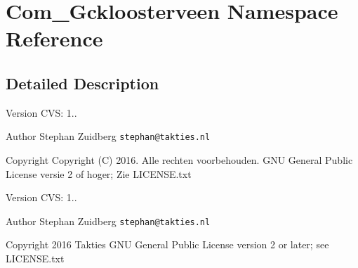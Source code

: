 \section{Com\+\_\+\+Gckloosterveen Namespace Reference}
\label{namespace_com___gckloosterveen}


\subsection{Detailed Description}
\begin{DoxyVersion}{Version}
C\+VS\+: 1..
\end{DoxyVersion}
\begin{DoxyAuthor}{Author}
Stephan Zuidberg {\tt stephan@takties.\+nl} 
\end{DoxyAuthor}
\begin{DoxyCopyright}{Copyright}
Copyright (C) 2016. Alle rechten voorbehouden.  G\+NU General Public License versie 2 of hoger; Zie L\+I\+C\+E\+N\+S\+E.\+txt
\end{DoxyCopyright}
\begin{DoxyVersion}{Version}
C\+VS\+: 1..
\end{DoxyVersion}
\begin{DoxyAuthor}{Author}
Stephan Zuidberg {\tt stephan@takties.\+nl} 
\end{DoxyAuthor}
\begin{DoxyCopyright}{Copyright}
2016 Takties  G\+NU General Public License version 2 or later; see L\+I\+C\+E\+N\+S\+E.\+txt 
\end{DoxyCopyright}
